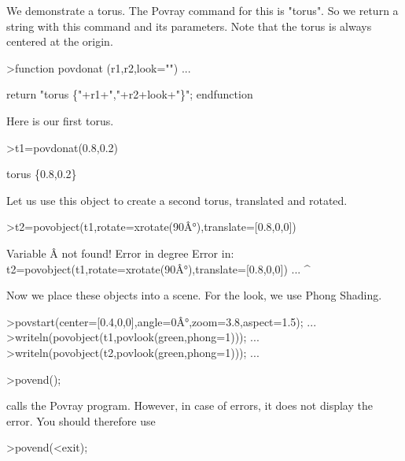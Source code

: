\documentclass[a4paper,10pt]{article}
\begin{document}
\begin{eulernotebook}
\begin{eulercomment}
We demonstrate a torus. The Povray command for this is "torus". So we
return a string with this command and its parameters. Note that the
torus is always centered at the origin.
\end{eulercomment}
\begin{eulerprompt}
>function povdonat (r1,r2,look="") ...
\end{eulerprompt}
\begin{eulerudf}
    return "torus \{"+r1+","+r2+look+"\}";
  endfunction
\end{eulerudf}
\begin{eulercomment}
Here is our first torus.
\end{eulercomment}
\begin{eulerprompt}
>t1=povdonat(0.8,0.2)
\end{eulerprompt}
\begin{euleroutput}
  torus \{0.8,0.2\}
\end{euleroutput}
\begin{eulercomment}
Let us use this object to create a second torus, translated and
rotated.
\end{eulercomment}
\begin{eulerprompt}
>t2=povobject(t1,rotate=xrotate(90Â°),translate=[0.8,0,0])
\end{eulerprompt}
\begin{euleroutput}
  Variable Â not found!
  Error in degree
  Error in:
  t2=povobject(t1,rotate=xrotate(90Â°),translate=[0.8,0,0]) ...
                                     ^
\end{euleroutput}
\begin{eulercomment}
Now we place these objects into a scene. For the look, we use Phong
Shading.
\end{eulercomment}
\begin{eulerprompt}
>povstart(center=[0.4,0,0],angle=0Â°,zoom=3.8,aspect=1.5); ...
>writeln(povobject(t1,povlook(green,phong=1))); ...
>writeln(povobject(t2,povlook(green,phong=1))); ...
\end{eulerprompt}
\begin{eulerttcomment}
 >povend();
\end{eulerttcomment}
\begin{eulercomment}
calls the Povray program. However, in case of errors, it does not
display the error. You should therefore use

\end{eulercomment}
\begin{eulerttcomment}
 >povend(<exit);
\end{eulerttcomment}
\begin{eulercomment}


\end{eulercomment}
\end{eulernotebook}
\end{document}
